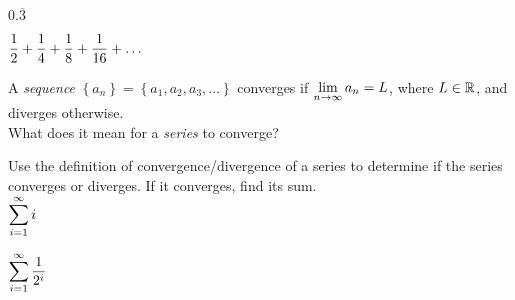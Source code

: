 \documentclass[12pt]{article}
\begin{document}
\vfill

\hspace{5mm} $0.\overline{3}$

\vfill

\hspace{5mm} $\displaystyle\frac{1}{2}+\frac{1}{4}+\frac{1}{8}+\frac{1}{16}+\dots$

\vfill

\newpage

A \textit{sequence} $\left\{a_n\right\}=\left\{a_1,a_2,a_3,\dots\right\}$ converges if $\displaystyle\lim_{n\to\infty}a_n=L$, where $L\in\mathbb{R}$, and diverges otherwise.\\

What does it mean for a \textit{series} to converge?\\


\Examples Use the definition of convergence/divergence of a series to determine if the series converges or diverges. If it converges, find its sum.\\

\hspace{5mm} $\displaystyle\sum_{i=1}^\infty i$

\vfill

\hspace{5mm} $\displaystyle\sum_{i=1}^\infty\frac{1}{2^i}$

\vfill
\end{document}
